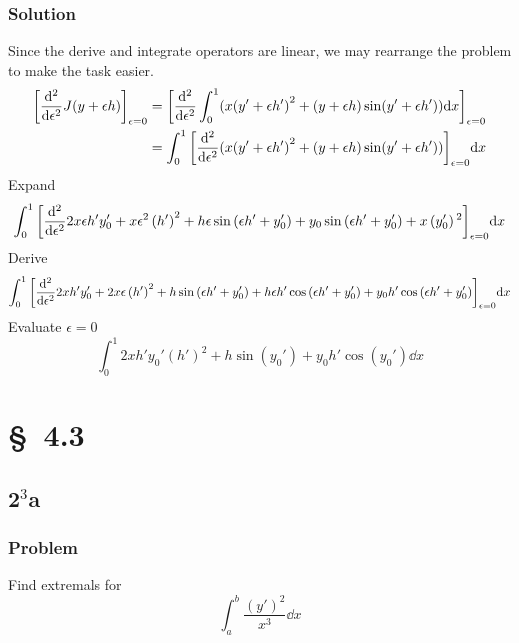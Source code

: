 \documentclass[12pt,twoside]{article}
\begin{document}
\subsubsection*{Solution}
Since the derive and integrate operators are linear, we may rearrange the
problem to make the task easier.
\begin{equation*}
  \begin{aligned}
    {\left[\od[2]{}{\epsilon} J(y+\epsilon h)\right]}_{\epsilon=0}
    &= {\left[\od[2]{}{\epsilon} \int_0^1(x{(y'+\epsilon h')}^2+(y+\epsilon h)\sin(y'+\epsilon h'))\dd{x} \right]}_{\epsilon=0} \\
    &= \int_0^1{\left[\od[2]{}{\epsilon} (x{(y'+\epsilon h')}^2+(y+\epsilon h)\sin(y'+\epsilon h'))\right]}_{\epsilon=0}\dd{x} \\
  \end{aligned}
\end{equation*}
Expand
\begin{equation*}
  \int_0^1{\left[\od[2]{}{\epsilon}
      2 x \epsilon h' y_0'+x \epsilon ^2 \left(h'\right)^2+h \epsilon \sin
      \left(\epsilon h'+y_0'\right)+y_0 \sin \left(\epsilon h'+y_0'\right)+x
      \left(y_0'\right){}^2
    \right]}_{\epsilon=0}\dd{x}
\end{equation*}
Derive
\begin{equation*}
  \int_0^1{\left[\od[2]{}{\epsilon}
      2 x h' y_0'+2 x \epsilon \left(h'\right)^2+h \sin \left(\epsilon
        h'+y_0'\right)+h \epsilon h' \cos \left(\epsilon h'+y_0'\right)+y_0 h' \cos
      \left(\epsilon h'+y_0'\right)
    \right]}_{\epsilon=0}\dd{x}
\end{equation*}
Evaluate $\epsilon=0$
\begin{equation*}
  \boxed{\int_0^1
      2 x h' y_0' \left(h'\right)^2+h \sin \left(y_0'\right)+y_0 h' \cos \left(y_0'\right)
    \dd{x}}
\end{equation*}

\section{\S~4.3}
\subsection{2$^3$a}
\subsubsection*{Problem}
Find extremals for
\begin{equation}
  \label{eq:4.3.2a-problem}
  \int_a^b \frac{{(y')}^2}{x^3}\dd{x}
\end{equation}
\end{document}
